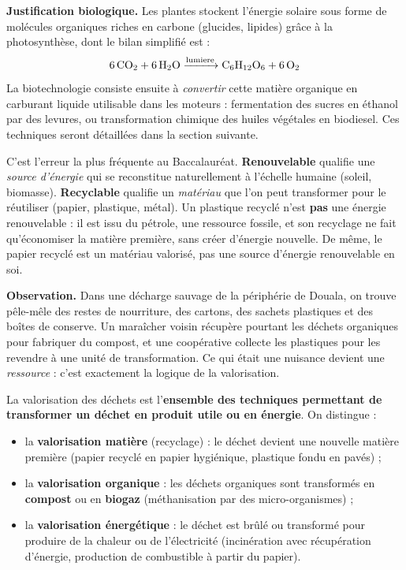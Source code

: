 \documentclass[11pt]{article}
\newcommand{\cle}[1]{{\popxbold\color{popdark}#1}}
\newcounter{popsec}
\newcounter{popsub}
\newcommand{\courssub}[1]{%
  \stepcounter{popsub}%
  \par\vspace{9pt}\noindent{\popxbold\fontsize{11.5}{13}\selectfont\color{popink}{\color{poporange}\thepopsec.\thepopsub}\hspace{6pt}#1}\par\nopagebreak\vspace{4pt}
}
\begin{document}
\textbf{Justification biologique.} Les plantes stockent l'énergie solaire sous forme de molécules organiques riches en carbone (glucides, lipides) grâce à la photosynthèse, dont le bilan simplifié est :
\[ \ce{6CO2 + 6H2O ->[lumiere] C6H12O6 + 6O2} \]
La biotechnologie consiste ensuite à \emph{convertir} cette matière organique en carburant liquide utilisable dans les moteurs : fermentation des sucres en éthanol par des levures, ou transformation chimique des huiles végétales en biodiesel. Ces techniques seront détaillées dans la section suivante.

\begin{attention}
C'est l'erreur la plus fréquente au Baccalauréat. \textbf{Renouvelable} qualifie une \emph{source d'énergie} qui se reconstitue naturellement à l'échelle humaine (soleil, biomasse). \textbf{Recyclable} qualifie un \emph{matériau} que l'on peut transformer pour le réutiliser (papier, plastique, métal). Un plastique recyclé n'est \textbf{pas} une énergie renouvelable : il est issu du pétrole, une ressource fossile, et son recyclage ne fait qu'économiser la matière première, sans créer d'énergie nouvelle. De même, le papier recyclé est un matériau valorisé, pas une source d'énergie renouvelable en soi.
\end{attention}

\courssub{La valorisation des déchets}

\textbf{Observation.} Dans une décharge sauvage de la périphérie de Douala, on trouve pêle-mêle des restes de nourriture, des cartons, des sachets plastiques et des boîtes de conserve. Un maraîcher voisin récupère pourtant les déchets organiques pour fabriquer du compost, et une coopérative collecte les plastiques pour les revendre à une unité de transformation. Ce qui était une nuisance devient une \emph{ressource} : c'est exactement la logique de la valorisation.

\begin{definition}
La \cle{valorisation des déchets} est l'\textbf{ensemble des techniques permettant de transformer un déchet en produit utile ou en énergie}. On distingue :
\begin{itemize}
\item la \textbf{valorisation matière} (recyclage) : le déchet devient une nouvelle matière première (papier recyclé en papier hygiénique, plastique fondu en pavés) ;
\item la \textbf{valorisation organique} : les déchets organiques sont transformés en \textbf{compost} ou en \textbf{biogaz} (méthanisation par des micro-organismes) ;
\item la \textbf{valorisation énergétique} : le déchet est brûlé ou transformé pour produire de la chaleur ou de l'électricité (incinération avec récupération d'énergie, production de combustible à partir du papier).
\end{itemize}
\end{definition}
\end{document}
